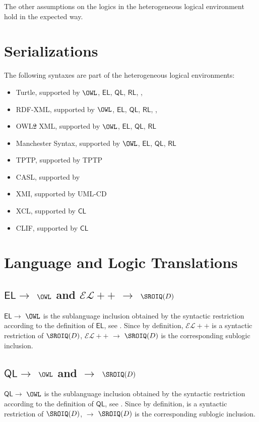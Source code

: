 \documentclass[10pt,fleqn,final]{scrreprt}
\newcommand*{\CL}{\ensuremath{\mathsf{CL}}\xspace}
\newcommand{\QL}{\ensuremath{\mathsf{QL}}\xspace}
\newcommand{\RL}{\ensuremath{\mathsf{RL}}\xspace}
\newcommand{\EL}{\ensuremath{\mathsf{EL}}\xspace}
\newcommand{\ELDL}{\ensuremath{\mathcal{EL}}\xspace}
\newcommand{\noterefname}{note}
\newcommand{\nref}[1]{\noterefname~\ref{#1}}
\newcommand{\sclause}[1]{\section{#1}}
\newcommand{\ssclause}[1]{\subsection{#1}}
\renewcommand{\nref}[1]{\ref{nref-#1}} %
\providecommand{\DIFadd}[1]{{\protect\color{blue}\uwave{#1}}} %
\providecommand{\DIFdel}[1]{{\protect\color{red}\sout{#1}}}                      %
\providecommand{\DIFaddbegin}{} %
\providecommand{\DIFaddend}{} %
\providecommand{\DIFdelbegin}{} %
\providecommand{\DIFdelend}{} %
\begin{document}
The other assumptions on the logics in the heterogeneous logical environment hold in
the expected way.\DIFdelbegin %
\DIFdelend \DIFaddbegin {}
\DIFaddend 

\sclause{Serializations}

The following syntaxes are part of the heterogeneous logical environments:
\begin{itemize}
 \item Turtle, supported by $\OWL$, \EL, \QL, \RL , \RDF, \RDFS
 \item RDF-XML, supported by $\OWL$, \EL, \QL, \RL , \RDF, \RDFS
 \item OWL\DIFdelbegin \DIFdel{2 }\DIFdelend \DIFaddbegin \DIFadd{/}\DIFaddend XML, supported by $\OWL$, \EL, \QL, \RL 
 \item Manchester Syntax, supported by $\OWL$, \EL, \QL, \RL
  \item TPTP, supported by TPTP
  \item CASL, supported by \CASL
 \item XMI, supported by UML\mbox{-}CD
 \item XCL, supported by \CL
 \item CLIF, supported by \CL 
\end{itemize}

\sclause{Language and Logic Translations}

\ssclause{\EL $\to$ $\OWL$ and $\ELDL{+}{+}$ $\to$ $\SROIQ(D)$}

\EL $\to$ $\OWL$ is the sublanguage inclusion obtained by the
syntactic restriction according to the definition of \EL, see
\DIFdelbegin %
\DIFdelend \DIFaddbegin \DIFadd{\nref{OWL2-profiles}}\DIFaddend . Since by definition, $\ELDL{+}{+}$
is a syntactic restriction of $\SROIQ(D)$, $\ELDL{+}{+}$ $\to$ $\SROIQ(D)$
is the corresponding sublogic inclusion.

\ssclause{\QL $\to$ $\OWL$ and \DLLiteR $\to$ $\SROIQ(D)$}

\QL $\to$ $\OWL$ is the sublanguage inclusion obtained by the
syntactic restriction according to the definition of \QL, see
\DIFdelbegin %
\DIFdelend \DIFaddbegin \DIFadd{\nref{OWL2-profiles}}\DIFaddend . Since by definition, \DLLiteR
is a syntactic restriction of $\SROIQ(D)$, \DLLiteR $\to$ $\SROIQ(D)$
is the corresponding sublogic inclusion.
\end{document}
